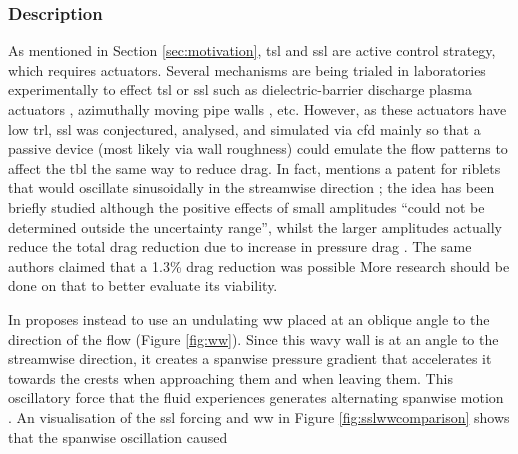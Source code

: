 \subsubsection{Description}
As mentioned in Section \ref{sec:motivation}, \gls{tsl} and \gls{ssl} are active control strategy, which requires actuators. Several mechanisms are being trialed in laboratories experimentally to effect \gls{tsl} or \gls{ssl} such as dielectric-barrier discharge plasma actuators \cite{choi2011}, azimuthally moving pipe walls \cite{auteri2010}, etc. However, as these actuators have low \gls{trl}, \gls{ssl} was conjectured, analysed, and simulated via \gls{cfd} mainly so that a passive device (most likely via wall roughness) could emulate the flow patterns to affect the \gls{tbl} the same way to reduce drag. In fact, \textcite{viotti2009} mentions a patent for riblets that would oscillate sinusoidally in the streamwise direction \cite{quadrio2008}; the idea has been briefly studied although the positive effects of small amplitudes ``could not be determined outside the uncertainty range'', whilst the larger amplitudes actually reduce the total drag reduction due to increase in pressure drag \cite{kramer2010}. The same authors claimed that a 1.3\% drag reduction was possible \cite{gruneberger2012}  More research should be done on that to better evaluate its viability.

In \cite{chernyshenko2013} \citeauthor{chernyshenko2013} proposes instead to use an undulating \gls{ww} placed at an oblique angle to the direction of the flow (Figure \ref{fig:ww}). Since this wavy wall is at an angle to the streamwise direction, it creates a spanwise pressure gradient that accelerates it towards the crests when approaching them and when leaving them. This oscillatory force that the fluid experiences generates alternating spanwise motion \cite{ghebali2017}. An visualisation of the \gls{ssl} forcing and \gls{ww} in Figure \ref{fig:sslwwcomparison} shows that the spanwise oscillation caused 

